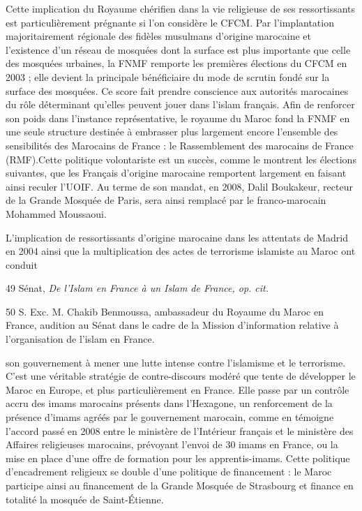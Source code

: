 Cette implication du Royaume chérifien dans la vie religieuse de ses
ressortissants est particulièrement prégnante si l'on considère le CFCM.
Par l'implantation majoritairement régionale des fidèles musulmans
d'origine marocaine et l'existence d'un réseau de mosquées dont la
surface est plus importante que celle des mosquées urbaines, la FNMF
remporte les premières élections du CFCM en 2003 ; elle devient la
principale bénéficiaire du mode de scrutin fondé sur la surface des
mosquées. Ce score fait prendre conscience aux autorités marocaines du
rôle déterminant qu'elles peuvent jouer dans l'islam français. Afin de
renforcer son poids dans l'instance représentative, le royaume du Maroc
fond la FNMF en une seule structure destinée à embrasser plus largement
encore l'ensemble des sensibilités des Marocains de France : le
Rassemblement des marocains de France (RMF).Cette politique volontariste
est un succès, comme le montrent les élections suivantes, que les
Français d'origine marocaine remportent largement en faisant ainsi
reculer l'UOIF. Au terme de son mandat, en 2008, Dalil Boukakeur,
recteur de la Grande Mosquée de Paris, sera ainsi remplacé par le
franco-marocain Mohammed Moussaoui.

L'implication de ressortissants d'origine marocaine dans les attentats
de Madrid en 2004 ainsi que la multiplication des actes de terrorisme
islamiste au Maroc ont conduit

49 Sénat, \emph{De l'Islam en France à un Islam de France, op. cit.}

50 S. Exc. M. Chakib Benmoussa, ambassadeur du Royaume du Maroc en
France, audition au Sénat dans le cadre de la Mission d'information
relative à l'organisation de l'islam en France.



son gouvernement à mener une lutte intense contre l'islamisme et le
terrorisme. C'est une véritable stratégie de contre-discours modéré que
tente de développer le Maroc en Europe, et plus particulièrement en
France. Elle passe par un contrôle accru des imams marocains présents
dans l'Hexagone, un renforcement de la présence d'imams agréés par le
gouvernement marocain, comme en témoigne l'accord passé en 2008 entre le
ministère de l'Intérieur français et le ministère des Affaires
religieuses marocains, prévoyant l'envoi de 30 imams en France, ou la
mise en place d'une offre de formation pour les apprentis-imams. Cette
politique d'encadrement religieux se double d'une politique de
financement : le Maroc participe ainsi au financement de la Grande
Mosquée de Strasbourg et finance en totalité la mosquée de
Saint-Étienne.

